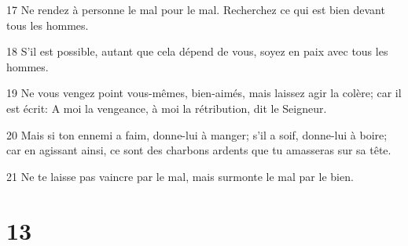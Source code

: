 \par 17 Ne rendez à personne le mal pour le mal. Recherchez ce qui est bien devant tous les hommes.
\par 18 S'il est possible, autant que cela dépend de vous, soyez en paix avec tous les hommes.
\par 19 Ne vous vengez point vous-mêmes, bien-aimés, mais laissez agir la colère; car il est écrit: A moi la vengeance, à moi la rétribution, dit le Seigneur.
\par 20 Mais si ton ennemi a faim, donne-lui à manger; s'il a soif, donne-lui à boire; car en agissant ainsi, ce sont des charbons ardents que tu amasseras sur sa tête.
\par 21 Ne te laisse pas vaincre par le mal, mais surmonte le mal par le bien.

\chapter{13}


